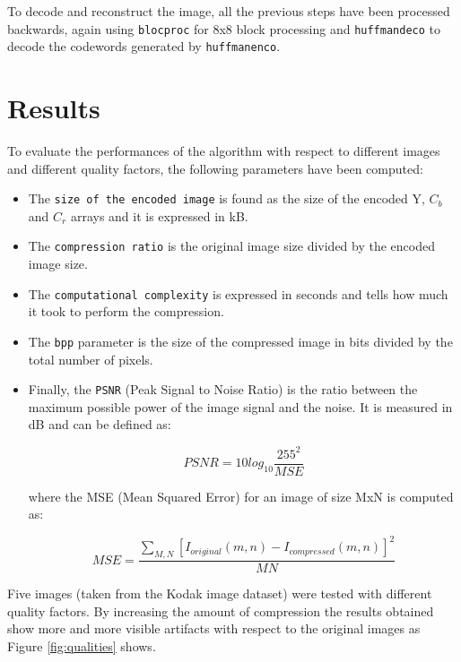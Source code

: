 \documentclass[14pt,a4paper]{extarticle}
\begin{document}
To decode and reconstruct the image, all the previous steps have been processed backwards, again using \texttt{blocproc} for 8x8 block processing and \texttt{huffmandeco} to decode the codewords generated by \texttt{huffmanenco}.

\section{Results}
To evaluate the performances of the algorithm with respect to different images and different quality factors, the following parameters have been computed:

\begin{itemize}
  \item The \texttt{size of the encoded image} is found as the size of the encoded Y, $C_b$ and $C_r$ arrays and it is expressed in kB.
  \item The \texttt{compression ratio} is the original image size divided by the encoded image size.
  \item The \texttt{computational complexity} is expressed in seconds and tells how much it took to perform the compression.
  \item The \texttt{bpp} parameter is the size of the compressed image in bits divided by the total number of pixels.
  \item Finally, the \texttt{PSNR} (Peak Signal to Noise Ratio) is the ratio between the maximum possible power of the image signal and the noise. It is measured in dB and can be defined as:
  
\begin{equation}
PSNR = 10 log_{10} \frac{255^{2}}{MSE}
\end{equation}

where the MSE (Mean Squared Error) for an image of size MxN is computed as:

\begin{equation}
MSE = \frac{\sum\limits_{M, N} [I_{original}(m, n) - I_{compressed}(m, n)]^{2}}{M N}
\end{equation}
\end{itemize}

Five images (taken from the Kodak image dataset) were tested with different quality factors. By increasing the amount of compression the results obtained show more and more visible artifacts with respect to the original images as Figure \ref{fig:qualities} shows.
\end{document}
